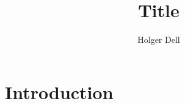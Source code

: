 \documentclass[a4paper,USenglish]{lipics-v2019}
\title{Title}
\author{Holger Dell}{IT University of Copenhagen, Copenhagen, Denmark \and Basic Algorithms Research Copenhagen (BARC)}{hold@itu.dk}{https://orcid.org/0000-0001-8955-0786}{}
\begin{document}
\maketitle

\begin{abstract}
\end{abstract}

 
\section{Introduction}



\end{document}
